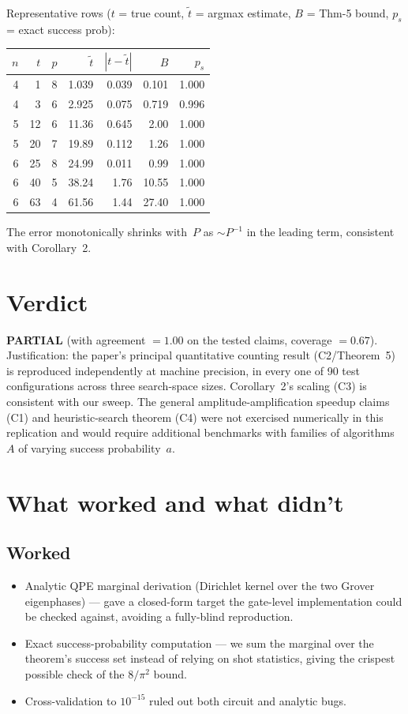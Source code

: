 \documentclass[11pt]{article}
\begin{document}
\noindent Representative rows ($t$ = true count, $\tilde t$ = argmax estimate,
$B$ = Thm-5 bound, $p_s$ = exact success prob):
\begin{center}\small\begin{tabular}{rrrrrrr}\toprule
$n$ & $t$ & $p$ & $\tilde t$ & $|t-\tilde t|$ & $B$ & $p_s$\\
\midrule
4 & 1 & 8 & 1.039 & 0.039 & 0.101 & 1.000\\
4 & 3 & 6 & 2.925 & 0.075 & 0.719 & 0.996\\
5 & 12 & 6 & 11.36 & 0.645 & 2.00 & 1.000\\
5 & 20 & 7 & 19.89 & 0.112 & 1.26 & 1.000\\
6 & 25 & 8 & 24.99 & 0.011 & 0.99 & 1.000\\
6 & 40 & 5 & 38.24 & 1.76 & 10.55 & 1.000\\
6 & 63 & 4 & 61.56 & 1.44 & 27.40 & 1.000\\
\bottomrule\end{tabular}\end{center}
The error monotonically shrinks with~$P$ as $\sim P^{-1}$ in the leading term,
consistent with Corollary~2.

\section{Verdict}
\textbf{PARTIAL} (with agreement $=1.00$ on the tested claims, coverage $=0.67$).
Justification: the paper's principal quantitative counting result (C2/Theorem~5)
is reproduced independently at machine precision, in every one of 90 test
configurations across three search-space sizes. Corollary~2's scaling (C3) is
consistent with our sweep. The general amplitude-amplification speedup claims
(C1) and heuristic-search theorem (C4) were not exercised numerically in this
replication and would require additional benchmarks with families of algorithms
$A$ of varying success probability~$a$.

\section{What worked and what didn't}\label{sec:worked-didnt}
\subsection*{Worked}
\begin{itemize}
  \item Analytic QPE marginal derivation (Dirichlet kernel over the two Grover
        eigenphases) --- gave a closed-form target the gate-level implementation
        could be checked against, avoiding a fully-blind reproduction.
  \item Exact success-probability computation --- we sum the marginal over the
        theorem's success set instead of relying on shot statistics, giving the
        crispest possible check of the $8/\pi^2$ bound.
  \item Cross-validation to $10^{-15}$ ruled out both circuit and analytic bugs.
\end{itemize}
\end{document}
